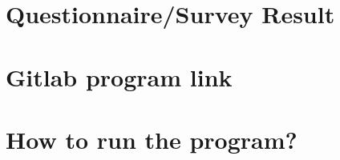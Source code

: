 \documentclass[12pt]{report}
\begin{document}
\begin{appendices}
\chapter{Questionnaire/Survey Result}


\chapter{Gitlab program link}


\chapter{How to run the program?}


\end{appendices}


\newpage
{}

\end{document}
